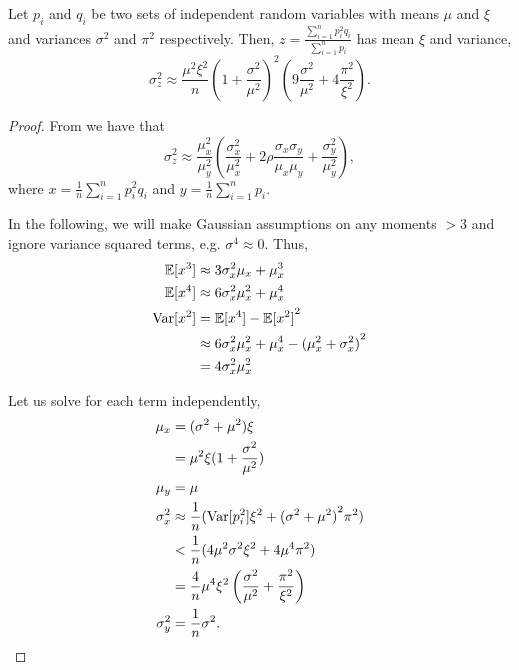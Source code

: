 \begin{lemma}
\label{lem:variance-ratio-average}
  Let $p_i$ and $q_i$ be two sets of independent random variables with means $\mu$ and $\xi$ and variances $\sigma^2$ and $\pi^2$ respectively.
  Then, $z = \frac{\sum_{i=1}^n p^2_i q_i}{\sum_{i=1}^n p_i}$ has mean $\xi$ and variance,
  $$\sigma^2_z \approx
  \frac{\mu^2 \xi^2}{n} {\left( 1 + \frac{\sigma^2}{\mu^2} \right)}^2
             \left(
                9 \frac{\sigma^2}{\mu^2} + 4 \frac{\pi^2}{\xi^2}
                \right).$$
\end{lemma}
\begin{proof}
  From  we have that
  $$\sigma^2_z \approx \frac{\mu^2_x}{\mu_y^2} \left(\frac{\sigma_x^2}{\mu_x^2} 
    + 2\rho \frac{\sigma_x \sigma_y}{\mu_x \mu_y}
    + \frac{\sigma_y^2}{\mu_y^2} \right),$$
    where $x = \frac{1}{n}\sum_{i=1}^n p_i^2 q_i$ and $y = \frac{1}{n}\sum_{i=1}^n p_i$.

  In the following, we will make Gaussian assumptions on any moments $>3$ and ignore variance squared terms, e.g. $\sigma^4 \approx 0$.
  Thus,
  \begin{align*}
    \mathbb{E}[x^3] &\approx 3\sigma_x^2 \mu_x + \mu_x^3 \\
    \mathbb{E}[x^4] &\approx 6\sigma_x^2 \mu_x^2 + \mu_x^4 \\
    \text{Var}[x^2] &= \mathbb{E}[x^4] - {\mathbb{E}[x^2]}^2 \\
              &\approx 6\sigma_x^2 \mu_x^2 + \mu_x^4 - {(\mu_x^2 + \sigma_x^2)}^2 \\
              &= 4\sigma_x^2 \mu_x^2 
  \end{align*}
  
  Let us solve for each term independently,
  \begin{align*}
    \mu_x &= (\sigma^2 + \mu^2) \xi \\
          &= \mu^2 \xi (1 + \frac{\sigma^2}{\mu^2}) \\
    \mu_y &= \mu \\
    \sigma_x^2 &\approx \frac{1}{n} (\text{Var}[{p_i^2}] \xi^2 + {(\sigma^2 + \mu^2)}^2 \pi^2) \\
               &<  \frac{1}{n} (4 \mu^2 \sigma^2 \xi^2 + 4 \mu^4 \pi^2) \\
               &= \frac{4}{n} \mu^4 \xi^2 \left( \frac{\sigma^2}{\mu^2}  + \frac{\pi^2}{\xi^2} \right) \\
    \sigma_y^2 &= \frac{1}{n} \sigma^2.
  \end{align*}


\end{proof}
